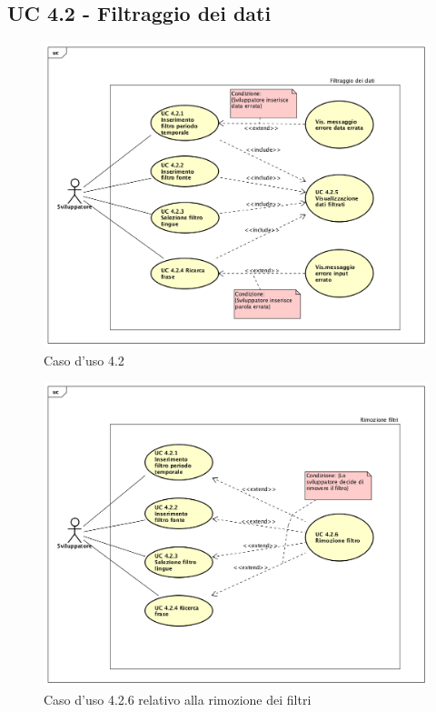 \subsection{UC 4.2 - Filtraggio dei dati}
\begin{figure}[H]
\centering
\includegraphics[width=17cm]{img/UC420.png} 
\caption{Caso d'uso 4.2}\label{fig:420}
\end{figure}
\begin{figure}[H]
\centering
\includegraphics[width=17cm]{img/UC426.png} 
\caption{Caso d'uso 4.2.6 relativo alla rimozione dei filtri}\label{fig:426}
\end{figure}
